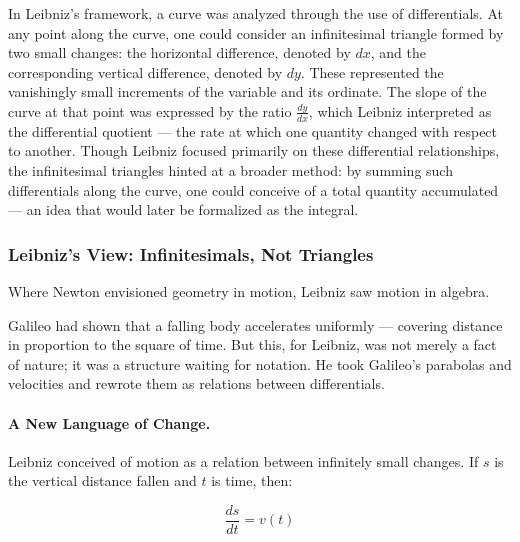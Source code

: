 In Leibniz’s framework, a curve was analyzed through the use of differentials. At any point along the curve, one could consider an infinitesimal triangle formed by two small changes: the horizontal difference, denoted by $dx$, and the corresponding vertical difference, denoted by $dy$. These represented the vanishingly small increments of the variable and its ordinate. The slope of the curve at that point was expressed by the ratio $\frac{dy}{dx}$, which Leibniz interpreted as the differential quotient — the rate at which one quantity changed with respect to another. Though Leibniz focused primarily on these differential relationships, the infinitesimal triangles hinted at a broader method: by summing such differentials along the curve, one could conceive of a total quantity accumulated — an idea that would later be formalized as the integral.

\subsubsection{Leibniz’s View: Infinitesimals, Not Triangles}

Where Newton envisioned geometry in motion, Leibniz saw motion in algebra.

Galileo had shown that a falling body accelerates uniformly — covering distance in proportion to the square of time. But this, for Leibniz, was not merely a fact of nature; it was a structure waiting for notation. He took Galileo’s parabolas and velocities and rewrote them as relations between differentials.


\paragraph{A New Language of Change.} Leibniz conceived of motion as a relation between infinitely small changes. If $s$ is the vertical distance fallen and $t$ is time, then:

\[
\frac{ds}{dt} = v(t)
\]

